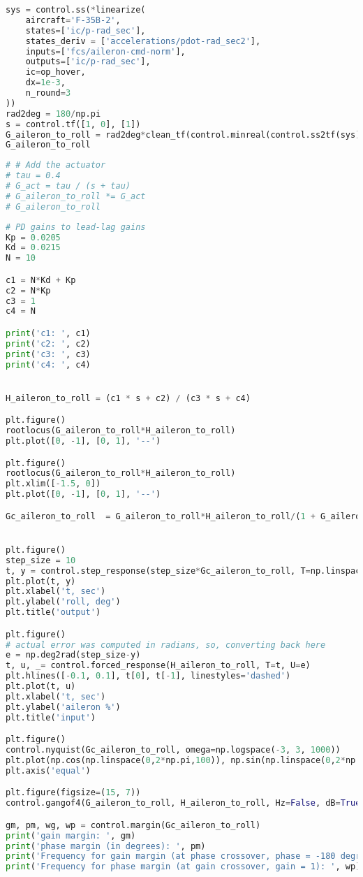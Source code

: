 \begin{lstlisting}[language=Python]
sys = control.ss(*linearize(
    aircraft='F-35B-2',
    states=['ic/p-rad_sec'],
    states_deriv = ['accelerations/pdot-rad_sec2'],
    inputs=['fcs/aileron-cmd-norm'],
    outputs=['ic/p-rad_sec'],
    ic=op_hover,
    dx=1e-3,
    n_round=3
))
rad2deg = 180/np.pi
s = control.tf([1, 0], [1])
G_aileron_to_roll = rad2deg*clean_tf(control.minreal(control.ss2tf(sys), 1e-3))/s
G_aileron_to_roll
\end{lstlisting}

\begin{lstlisting}[language=Python]
# # Add the actuator 
# tau = 0.4
# G_act = tau / (s + tau)
# G_aileron_to_roll *= G_act
# G_aileron_to_roll
\end{lstlisting}

\begin{lstlisting}[language=Python]
# PD gains to lead-lag gains 
Kp = 0.0205
Kd = 0.0215
N = 10

c1 = N*Kd + Kp
c2 = N*Kp
c3 = 1
c4 = N

print('c1: ', c1)
print('c2: ', c2)
print('c3: ', c3)
print('c4: ', c4)


H_aileron_to_roll = (c1 * s + c2) / (c3 * s + c4)

plt.figure()
rootlocus(G_aileron_to_roll*H_aileron_to_roll)
plt.plot([0, -1], [0, 1], '--')

plt.figure()
rootlocus(G_aileron_to_roll*H_aileron_to_roll)
plt.xlim([-1.5, 0])
plt.plot([0, -1], [0, 1], '--')

Gc_aileron_to_roll  = G_aileron_to_roll*H_aileron_to_roll/(1 + G_aileron_to_roll*H_aileron_to_roll)


plt.figure()
step_size = 10
t, y = control.step_response(step_size*Gc_aileron_to_roll, T=np.linspace(0, 30, 1000))
plt.plot(t, y)
plt.xlabel('t, sec')
plt.ylabel('roll, deg')
plt.title('output')

plt.figure()
# actual error was computed in radians, so, converting back here
e = np.deg2rad(step_size-y)
t, u, _= control.forced_response(H_aileron_to_roll, T=t, U=e)
plt.hlines([-0.1, 0.1], t[0], t[-1], linestyles='dashed')
plt.plot(t, u)
plt.xlabel('t, sec')
plt.ylabel('aileron %')
plt.title('input')

plt.figure()
control.nyquist(Gc_aileron_to_roll, omega=np.logspace(-3, 3, 1000))
plt.plot(np.cos(np.linspace(0,2*np.pi,100)), np.sin(np.linspace(0,2*np.pi,100)), '--')
plt.axis('equal')

plt.figure(figsize=(15, 7))
control.gangof4(G_aileron_to_roll, H_aileron_to_roll, Hz=False, dB=True)

gm, pm, wg, wp = control.margin(Gc_aileron_to_roll)
print('gain margin: ', gm)
print('phase margin (in degrees): ', pm)
print('Frequency for gain margin (at phase crossover, phase = -180 degrees): ', wg)
print('Frequency for phase margin (at gain crossover, gain = 1): ', wp)
\end{lstlisting}

